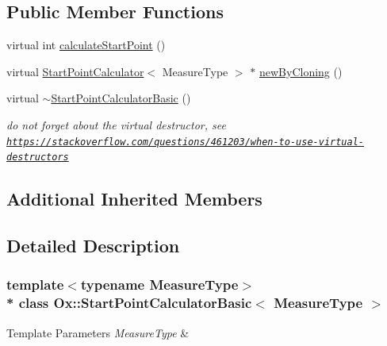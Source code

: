 \subsection*{Public Member Functions}
\begin{DoxyCompactItemize}
\item 
virtual int \hyperlink{class_ox_1_1_start_point_calculator_basic_a9d227adf887f091f180f3e2fd37ab2cc}{calculate\+Start\+Point} ()
\item 
virtual \hyperlink{class_ox_1_1_start_point_calculator}{Start\+Point\+Calculator}$<$ Measure\+Type $>$ $\ast$ \hyperlink{class_ox_1_1_start_point_calculator_basic_a65bb3460d9358f3d9538648e221c8247}{new\+By\+Cloning} ()
\item 
virtual \hyperlink{class_ox_1_1_start_point_calculator_basic_a7e55561e008088c26459c210e95b69e1}{$\sim$\+Start\+Point\+Calculator\+Basic} ()\hypertarget{class_ox_1_1_start_point_calculator_basic_a7e55561e008088c26459c210e95b69e1}{}\label{class_ox_1_1_start_point_calculator_basic_a7e55561e008088c26459c210e95b69e1}

\begin{DoxyCompactList}\small\item\em do not forget about the virtual destructor, see \href{https://stackoverflow.com/questions/461203/when-to-use-virtual-destructors}{\tt https\+://stackoverflow.\+com/questions/461203/when-\/to-\/use-\/virtual-\/destructors} \end{DoxyCompactList}\end{DoxyCompactItemize}
\subsection*{Additional Inherited Members}


\subsection{Detailed Description}
\subsubsection*{template$<$typename Measure\+Type$>$\\*
class Ox\+::\+Start\+Point\+Calculator\+Basic$<$ Measure\+Type $>$}


\begin{DoxyTemplParams}{Template Parameters}
{\em Measure\+Type} & \\
\hline
\end{DoxyTemplParams}


